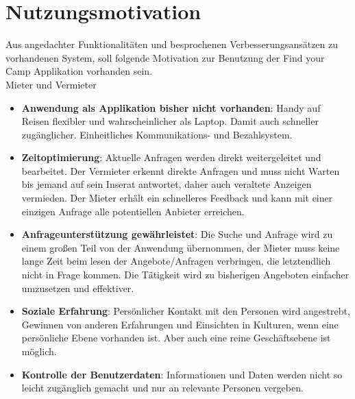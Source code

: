 
\section{Nutzungsmotivation}
Aus angedachter Funktionalitäten und besprochenen Verbesserungsansätzen zu vorhandenen System, soll folgende Motivation zur Benutzung der Find your Camp Applikation vorhanden sein.\\

Mieter und Vermieter
\begin{itemize}
   \item 
   \textbf{Anwendung als Applikation bisher nicht vorhanden}: Handy auf Reisen flexibler und wahrscheinlicher als Laptop. Damit auch schneller zugänglicher. Einheitliches Kommunikations- und Bezahlsystem.

   \item 
   \textbf{Zeitoptimierung}: Aktuelle Anfragen werden direkt weitergeleitet und bearbeitet. Der Vermieter erkennt direkte Anfragen und muss nicht Warten bis jemand auf sein Inserat antwortet, daher auch veraltete Anzeigen vermieden. Der Mieter erhält ein schnelleres Feedback und kann mit einer einzigen Anfrage alle potentiellen Anbieter erreichen.

   \item 
   \textbf{Anfrageunterstützung gewährleistet}: Die Suche und Anfrage wird zu einem großen Teil von der Anwendung übernommen, der Mieter muss keine lange Zeit beim lesen der Angebote/Anfragen verbringen, die letztendlich nicht in Frage kommen. Die Tätigkeit wird zu bisherigen Angeboten einfacher umzusetzen und effektiver.

   \item 
   \textbf{Soziale Erfahrung}: Persönlicher Kontakt mit den Personen wird angestrebt, Gewinnen von anderen Erfahrungen und Einsichten in Kulturen, wenn eine persönliche Ebene vorhanden ist.
   Aber auch eine reine Geschäftsebene ist möglich.

   \item
   \textbf{Kontrolle der Benutzerdaten}: Informationen und Daten werden nicht so leicht zugänglich gemacht und nur an relevante Personen vergeben.

\end{itemize}

